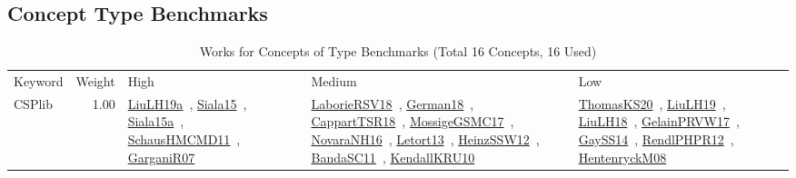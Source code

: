 \subsection{Concept Type Benchmarks}
\label{sec:Benchmarks}
\label{Benchmarks}
{\scriptsize
\begin{longtable}{p{3cm}r>{\raggedright\arraybackslash}p{6cm}>{\raggedright\arraybackslash}p{6cm}>{\raggedright\arraybackslash}p{8cm}}
\rowcolor{white}\caption{Works for Concepts of Type Benchmarks (Total 16 Concepts, 16 Used)}\\ \toprule
\rowcolor{white}Keyword & Weight & High & Medium & Low\\ \midrule\endhead
\bottomrule
\endfoot
\index{CSPlib}\index{Benchmarks!CSPlib}CSPlib &  1.00 & \href{../works/LiuLH19a.pdf}{LiuLH19a}~\cite{LiuLH19a}, \href{../works/Siala15.pdf}{Siala15}~\cite{Siala15}, \href{../works/Siala15a.pdf}{Siala15a}~\cite{Siala15a}, \href{../works/SchausHMCMD11.pdf}{SchausHMCMD11}~\cite{SchausHMCMD11}, \href{../works/GarganiR07.pdf}{GarganiR07}~\cite{GarganiR07} & \href{../works/LaborieRSV18.pdf}{LaborieRSV18}~\cite{LaborieRSV18}, \href{../works/German18.pdf}{German18}~\cite{German18}, \href{../works/CappartTSR18.pdf}{CappartTSR18}~\cite{CappartTSR18}, \href{../works/MossigeGSMC17.pdf}{MossigeGSMC17}~\cite{MossigeGSMC17}, \href{../works/NovaraNH16.pdf}{NovaraNH16}~\cite{NovaraNH16}, \href{../works/Letort13.pdf}{Letort13}~\cite{Letort13}, \href{../works/HeinzSSW12.pdf}{HeinzSSW12}~\cite{HeinzSSW12}, \href{../works/BandaSC11.pdf}{BandaSC11}~\cite{BandaSC11}, \href{../works/KendallKRU10.pdf}{KendallKRU10}~\cite{KendallKRU10} & \href{../works/ThomasKS20.pdf}{ThomasKS20}~\cite{ThomasKS20}, \href{../works/LiuLH19.pdf}{LiuLH19}~\cite{LiuLH19}, \href{../works/LiuLH18.pdf}{LiuLH18}~\cite{LiuLH18}, \href{../works/GelainPRVW17.pdf}{GelainPRVW17}~\cite{GelainPRVW17}, \href{../works/GaySS14.pdf}{GaySS14}~\cite{GaySS14}, \href{../works/RendlPHPR12.pdf}{RendlPHPR12}~\cite{RendlPHPR12}, \href{../works/HentenryckM08.pdf}{HentenryckM08}~\cite{HentenryckM08}\\

\end{longtable}}
